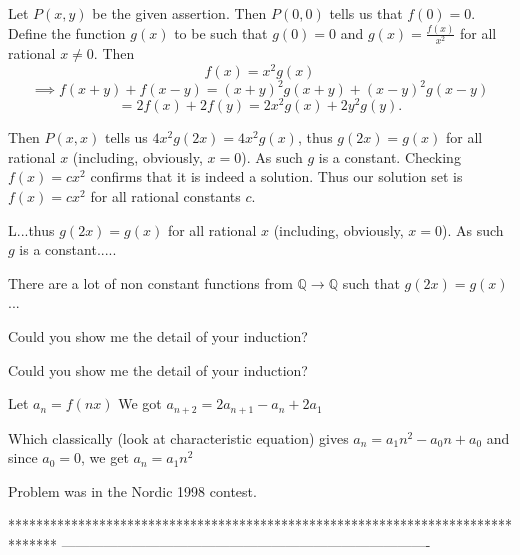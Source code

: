 \begin{solution}
	Let $P(x,y)$ be the given assertion. Then $P(0,0)$ tells us that $f(0)=0$. Define the function $g(x)$ to be such that $g(0)=0$ and $g(x)=\frac{f(x)}{x^2}$ for all rational $x \neq 0$. Then 
\[f(x)=x^2g(x)\]
\[\implies f(x+y)+f(x-y)=(x+y)^2g(x+y)+(x-y)^2g(x-y)\]
\[=2f(x)+2f(y)=2x^2g(x)+2y^2g(y).\] 

Then $P(x,x)$ tells us $4x^2g(2x)=4x^2g(x)$, thus $g(2x)=g(x)$ for all rational $x$ (including, obviously, $x=0$). As such $g$ is a constant. Checking $f(x)=cx^2$ confirms that it is indeed a solution. Thus our solution set is $f(x)=cx^2$ for all rational constants $c$.
\end{solution}



\begin{solution}
	\begin{tcolorbox}L...thus $g(2x)=g(x)$ for all rational $x$ (including, obviously, $x=0$). As such $g$ is a constant.....\end{tcolorbox}
There are a lot of non constant functions from $\mathbb Q\to\mathbb Q$ such that $g(2x)=g(x)$ ...
\end{solution}



\begin{solution}
	Could you show me the detail of your induction?
\end{solution}



\begin{solution}
	\begin{tcolorbox}Could you show me the detail of your induction?\end{tcolorbox}
Let $a_n=f(nx)$
We got $a_{n+2}=2a_{n+1}-a_n+2a_1$

Which classically (look at characteristic equation) gives $a_n=a_1n^2-a_0n+a_0$ and since $a_0=0$, we get $a_n=a_1n^2$
\end{solution}



\begin{solution}
	Problem was in the Nordic 1998 contest.
\end{solution}
*******************************************************************************
-------------------------------------------------------------------------------

